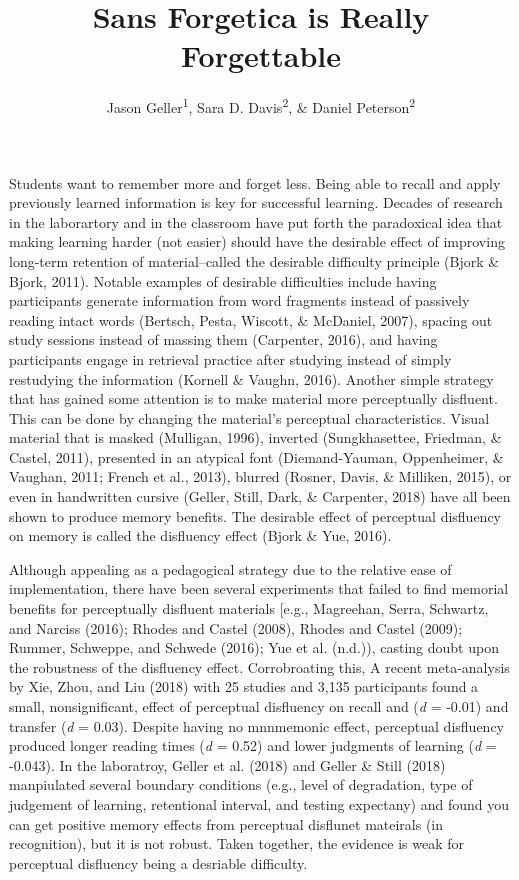 \documentclass[english,pdf]{apa6}
\author{Jason Geller\textsuperscript{1}, Sara D. Davis\textsuperscript{2}, \& Daniel Peterson\textsuperscript{2}}
\affiliation{
\vspace{0.5cm}
\textsuperscript{1} University of Iowa\\\textsuperscript{2} Skidmore College}
\title{Sans Forgetica is Really Forgettable}
\date{}
\begin{document}
\maketitle

Students want to remember more and forget less. Being able to recall and apply previously learned information is key for successful learning. Decades of research in the laborartory and in the classroom have put forth the paradoxical idea that making learning harder (not easier) should have the desirable effect of improving long-term retention of material--called the desirable difficulty principle (Bjork \& Bjork, 2011). Notable examples of desirable difficulties include having participants generate information from word fragments instead of passively reading intact words (Bertsch, Pesta, Wiscott, \& McDaniel, 2007), spacing out study sessions instead of massing them (Carpenter, 2016), and having participants engage in retrieval practice after studying instead of simply restudying the information (Kornell \& Vaughn, 2016). Another simple strategy that has gained some attention is to make material more perceptually disfluent. This can be done by changing the material's perceptual characteristics. Visual material that is masked (Mulligan, 1996), inverted (Sungkhasettee, Friedman, \& Castel, 2011), presented in an atypical font (Diemand-Yauman, Oppenheimer, \& Vaughan, 2011; French et al., 2013), blurred (Rosner, Davis, \& Milliken, 2015), or even in handwritten cursive (Geller, Still, Dark, \& Carpenter, 2018) have all been shown to produce memory benefits. The desirable effect of perceptual disfluency on memory is called the disfluency effect (Bjork \& Yue, 2016).

Although appealing as a pedagogical strategy due to the relative ease of implementation, there have been several experiments that failed to find memorial benefits for perceptually disfluent materials {[}e.g., Magreehan, Serra, Schwartz, and Narciss (2016); Rhodes and Castel (2008), Rhodes and Castel (2009); Rummer, Schweppe, and Schwede (2016); Yue et al. (n.d.)), casting doubt upon the robustness of the disfluency effect. Corrobroating this, A recent meta-analysis by Xie, Zhou, and Liu (2018) with 25 studies and 3,135 participants found a small, nonsignificant, effect of perceptual disfluency on recall and (\emph{d} = -0.01) and transfer (\emph{d} = 0.03). Despite having no mnnmemonic effect, perceptual disfluency produced longer reading times (\emph{d} = 0.52) and lower judgments of learning (\emph{d} = -0.043). In the laboratroy, Geller et al. (2018) and Geller \& Still (2018) manpiulated several boundary conditions (e.g., level of degradation, type of judgement of learning, retentional interval, and testing expectany) and found you can get positive memory effects from perceptual disflunet mateirals (in recognition), but it is not robust. Taken together, the evidence is weak for perceptual disfluency being a desriable difficulty.
\end{document}
